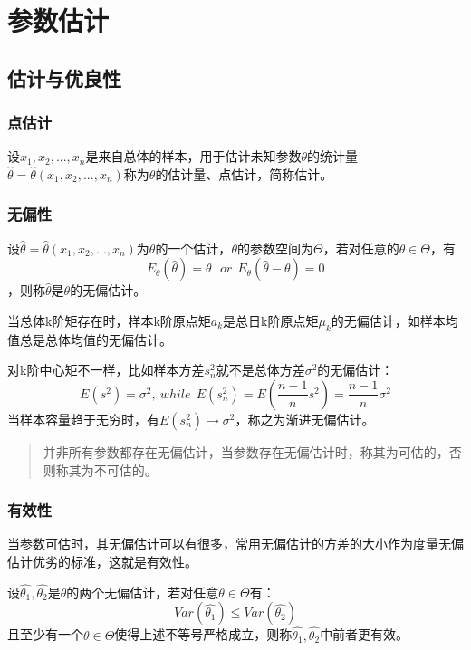 \documentclass[
]{book}
\begin{document}
\chapter{参数估计}\label{ux53c2ux6570ux4f30ux8ba1}

\section{估计与优良性}\label{ux4f30ux8ba1ux4e0eux4f18ux826fux6027}

\subsection{点估计}\label{ux70b9ux4f30ux8ba1}

设\(x_1,x_2,...,x_n\)是来自总体的样本，用于估计未知参数\(\theta\)的统计量\(\hat{\theta}=\hat{\theta}(x_1,x_2,...,x_n)\)称为\(\theta\)的估计量、点估计，简称估计。

\subsection{无偏性}\label{ux65e0ux504fux6027}

设\(\hat{\theta}=\hat{\theta}(x_1,x_2,...,x_n)\)为\(\theta\)的一个估计，\(\theta\)的参数空间为\(\Theta\)，若对任意的\(\theta\in \Theta\)，有
\[
E_{\theta}(\hat{\theta})=\theta\ \ \  or \ \ E_{\theta}(\hat{\theta}-\theta)=0
\]
，则称\(\hat{\theta}\)是\(\theta\)的无偏估计。

当总体k阶矩存在时，样本k阶原点矩\(a_k\)是总日k阶原点矩\(\mu_k\)的无偏估计，如样本均值总是总体均值的无偏估计。

对k阶中心矩不一样，比如样本方差\(s_n^2\)就不是总体方差\(\sigma^2\)的无偏估计：
\[
E(s^2)=\sigma^2,\ while\ \ E(s_n^2)=E(\frac{n-1}{n}s^2)=\frac{n-1}{n}\sigma^2
\]
当样本容量趋于无穷时，有\(E(s_n^2)\rightarrow \sigma^2\)，称之为渐进无偏估计。

\begin{quote}
并非所有参数都存在无偏估计，当参数存在无偏估计时，称其为可估的，否则称其为不可估的。
\end{quote}

\subsection{有效性}\label{ux6709ux6548ux6027}

当参数可估时，其无偏估计可以有很多，常用无偏估计的方差的大小作为度量无偏估计优劣的标准，这就是有效性。

设\(\hat{\theta_1},\hat{\theta_2}\)是\(\theta\)的两个无偏估计，若对任意\(\theta\in \Theta\)有：
\[
Var(\hat{\theta_1})\leq Var(\hat{\theta_2})
\]
且至少有一个\(\theta\in \Theta\)使得上述不等号严格成立，则称\(\hat{\theta_1},\hat{\theta_2}\)中前者更有效。
\end{document}
